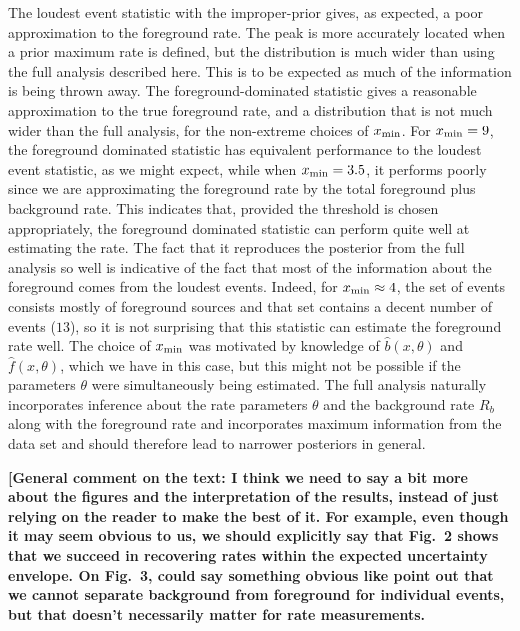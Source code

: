 \documentclass[aps,prd]{revtex4-1}
\newcommand{\ilya}[1]{{\color{red} \bf #1}}
\begin{document}
The loudest event statistic with the improper-prior gives, as expected, a poor approximation to the foreground rate. The peak is more accurately located when a prior maximum rate is defined, but the distribution is much wider than using the full analysis described here. This is to be expected as much of the information is being thrown away. The foreground-dominated statistic gives a reasonable approximation to the true foreground rate, and a distribution that is not much wider than the full analysis, for the non-extreme choices of $x_{\rm min}$. For $x_{\rm min}=9$, the foreground dominated statistic has equivalent performance to the loudest event statistic, as we might expect, while when $x_{\rm min}=3.5$, it performs poorly since we are approximating the foreground rate by the total foreground plus background rate. This indicates that, provided the threshold is chosen appropriately, the foreground dominated statistic can perform quite well at estimating the rate. The fact that it reproduces the posterior from the full analysis so well is indicative of the fact that most of the information about the foreground comes from the loudest events. Indeed, for $x_{\rm min} \approx 4$, the set of events consists mostly of foreground sources and that set contains a decent number of events ($13$), so it is not surprising that this statistic can estimate the foreground rate well. The choice of $x_{\rm min}$ was motivated by knowledge of $\hat{b}(x,\theta)$ and $\hat{f}(x,\theta)$, which we have in this case, but this might not be possible if the parameters $\theta$ were simultaneously being estimated. The full analysis naturally incorporates inference about the rate parameters $\theta$ and the background rate $R_b$ along with the foreground rate and incorporates maximum information from the data set and should therefore lead to narrower posteriors in general.


\ilya{[General comment on the text: I think we need to say a bit more
    about the figures and the interpretation of the results, instead
    of just relying on the reader to make the best of it.  For
    example, even though it may seem obvious to us, we should
    explicitly say that Fig.~2 shows that we succeed in recovering
    rates within the expected uncertainty envelope.  On Fig.~3, could
    say something obvious like point out that we cannot separate
    background from foreground for individual events, but that doesn't
    necessarily matter for rate measurements.}
\end{document}
